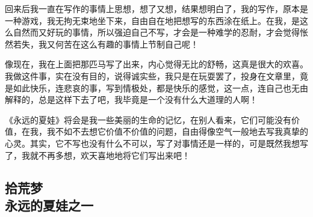 \par 回来后我一直在写作的事情上思想，想了又想，结果想明白了，我的写作，原本是一种游戏，我无拘无束地坐下来，自由自在地把想写的东西涂在纸上。在我，是这么自然而又好玩的事情，所以强迫自己不写，才会是一种难学的忍耐，才会觉得怅然若失，我又何苦在这么有趣的事情上节制自己呢！
\par 像现在，我在上面把那匹马写了出来，内心觉得无比的舒畅，这真是很大的欢喜。我做这件事，实在没有目的，说得诚实些，我只是在玩耍罢了，投身在文章里，竟是如此快乐，连悲哀的事，写到情极处，都是快乐的感觉，这一点，连自己也无由解释的，总是这样下去了吧，我毕竟是一个没有什么大道理的人啊！
\par 《永远的夏娃》将会是我一些美丽的生命的记忆，在别人看来，它们可能没有价值，在我，我不如不去想它价值不价值的问题，自由得像空气一般地去写我真挚的心灵。其实，它不写也没有什么不可以，写了对事情还是一样的，可是既然我想写了，我就不再多想，欢天喜地地将它们写出来吧！



\subsection{拾荒梦\\\small{永远的夏娃之一}}


